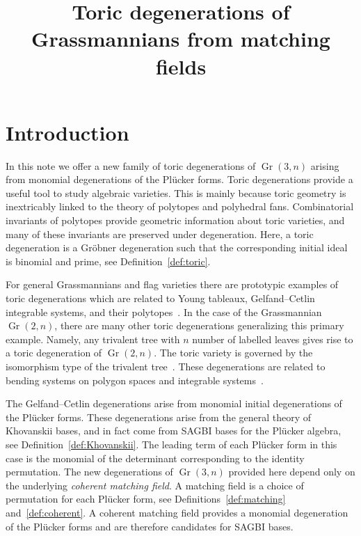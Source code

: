 \documentclass[ALCO,ThmDefs,Unicode,epreuves]{cedram}
\author{\firstname{Fatemeh} \lastname{Mohammadi}}%
\author{\firstname{Kristin} \lastname{Shaw}}%
\title[Toric degenerations of Grassmannians from matching fields]
{Toric degenerations of Grassmannians from matching fields}
\DeclareMathOperator{\Gr}{Gr}
\begin{document}
\maketitle

\section{Introduction}
In this note we offer a new family of toric degenerations 
of $\Gr(3, n)$ arising from monomial degenerations of the Pl{\"u}cker forms. 
Toric degenerations provide a useful tool to study algebraic varieties. This is mainly because toric geometry is inextricably linked to the theory of polytopes and polyhedral fans. 
Combinatorial invariants of polytopes provide geometric information about toric varieties, and many of these invariants 
are preserved under degeneration. Here, a toric degeneration is a Gr{\"o}bner degeneration such that the corresponding initial ideal is binomial and prime, see Definition~\ref{def:toric}. 



For general Grassmannians and flag varieties there are prototypic examples of toric degenerations which are related to Young tableaux, Gelfand--Cetlin integrable systems, and their polytopes~\cite{ FvectorGC, KOGAN}.
In the case of the Grassmannian $\Gr(2,n)$, there are many other toric degenerations generalizing this primary example. Namely, any trivalent tree with $n$ number of labelled leaves gives rise to a toric degeneration of $\Gr(2, n)$.
The toric variety is governed by the isomorphism type of the trivalent tree~\cite{SpeyerSturmfels, Witaszek}.
These degenerations are related to bending systems on polygon spaces and integrable systems~\cite{Kapovich, NISHINOU}. 


The Gelfand--Cetlin degenerations arise from monomial initial degenerations of the Pl{\"u}cker forms. These degenerations arise from the general theory of Khovanskii bases, and in fact come from SAGBI bases for the Pl{\"u}cker algebra, see Definition~\ref{def:Khovanskii}. 
The leading term of each Pl{\"u}cker form in this case is the monomial of the determinant corresponding to the identity permutation. The new degenerations of $\Gr(3, n)$ provided here depend only on the underlying \emph{coherent matching field}. A matching field is a choice of permutation for each Pl{\"u}cker form, see Definitions~\ref{def:matching} and~\ref{def:coherent}. A coherent matching field provides a monomial degeneration of the Pl{\"u}cker forms and are therefore candidates for SAGBI bases. 
\end{document}
